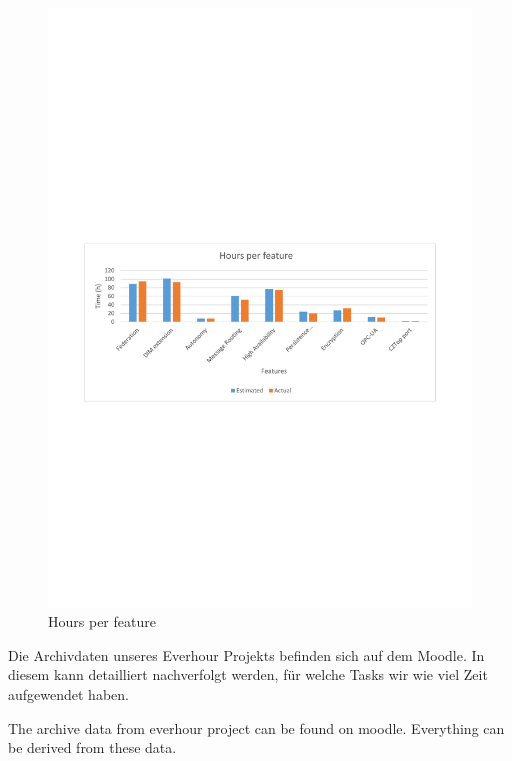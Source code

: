 \begin{figure}[]
	\includegraphics[trim=2cm 10.5cm 2cm 11.9cm, clip=true, width=\textwidth]{img/project_monitoring_hours_per_feature_diagram.pdf}
	\caption{Hours per feature}
	\label{fig:hours:per:feature}
\end{figure}


Die Archivdaten unseres Everhour Projekts befinden sich auf dem Moodle. 
In diesem kann detailliert nachverfolgt werden, 
für welche Tasks wir wie viel Zeit aufgewendet haben.

The archive data from everhour project can be found on moodle. Everything can be derived from these data.

